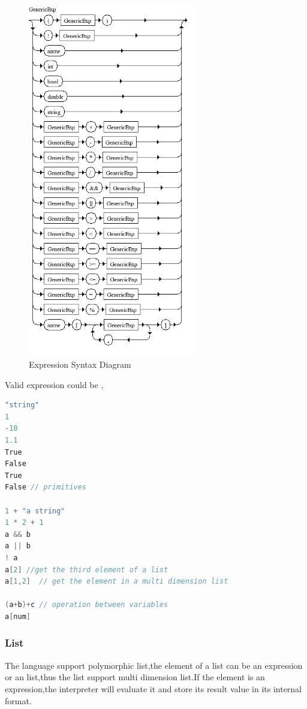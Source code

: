 \begin{figure}[h!]
  \centering
	\includegraphics[width=0.65\textwidth]{pic/c4/generic_exp.png}
	\caption{Expression Syntax Diagram}
\end{figure}


Valid expression could be ,
\begin{lstlisting}[language=java]
"string"
1
-10 
1.1
True
False
True 
False // primitives 

1 + "a string"
1 * 2 + 1  
a && b
a || b
! a
a[2] //get the third element of a list
a[1,2]  // get the element in a multi dimension list

(a+b)+c // operation between variables
a[num] 
\end{lstlisting}


\subsubsection*{List}
The language support polymorphic list,the element of a list can be an expression or an list,thus the list support multi dimension list.If the element is an expression,the interpreter will evaluate it and store its result value in its internal format.

